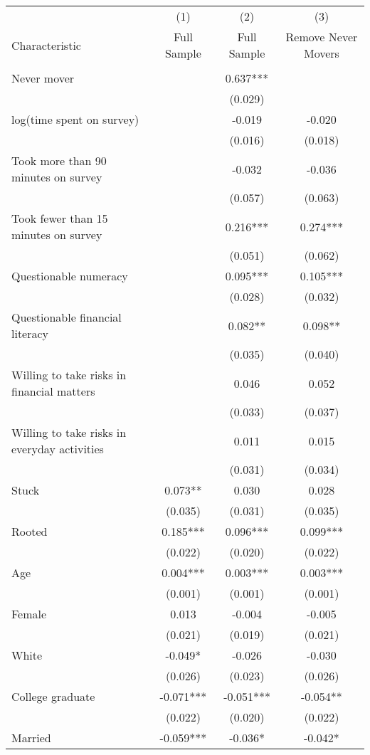 \begin{tabular}{lccc} \hline
 & (1) & (2) & (3) \\
Characteristic & Full Sample & Full Sample & Remove Never Movers \\ \hline
 &  &  &  \\
Never mover &  & 0.637*** &  \\
 &  & (0.029) &  \\
log(time spent on survey) &  & -0.019 & -0.020 \\
 &  & (0.016) & (0.018) \\
Took more than 90 minutes on survey &  & -0.032 & -0.036 \\
 &  & (0.057) & (0.063) \\
Took fewer than 15 minutes on survey &  & 0.216*** & 0.274*** \\
 &  & (0.051) & (0.062) \\
Questionable numeracy &  & 0.095*** & 0.105*** \\
 &  & (0.028) & (0.032) \\
Questionable financial literacy &  & 0.082** & 0.098** \\
 &  & (0.035) & (0.040) \\
Willing to take risks in financial matters &  & 0.046 & 0.052 \\
 &  & (0.033) & (0.037) \\
Willing to take risks in everyday activities &  & 0.011 & 0.015 \\
 &  & (0.031) & (0.034) \\
Stuck & 0.073** & 0.030 & 0.028 \\
 & (0.035) & (0.031) & (0.035) \\
Rooted & 0.185*** & 0.096*** & 0.099*** \\
 & (0.022) & (0.020) & (0.022) \\
Age & 0.004*** & 0.003*** & 0.003*** \\
 & (0.001) & (0.001) & (0.001) \\
Female & 0.013 & -0.004 & -0.005 \\
 & (0.021) & (0.019) & (0.021) \\
White & -0.049* & -0.026 & -0.030 \\
 & (0.026) & (0.023) & (0.026) \\
College graduate & -0.071*** & -0.051*** & -0.054** \\
 & (0.022) & (0.020) & (0.022) \\
Married & -0.059*** & -0.036* & -0.042* \\

\end{tabular}
